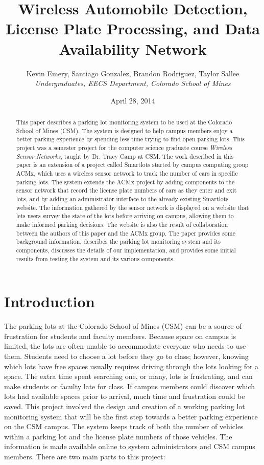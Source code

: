 \documentclass[11pt, oneside, fullpage, doublespace]{article}
\title{Wireless Automobile Detection, License Plate Processing, and Data Availability Network}
\author{Kevin Emery, Santiago Gonzalez, Brandon Rodriguez, Taylor Sallee\\ \emph{Undergraduates, EECS Department, Colorado School of Mines}}
\date{April 28, 2014}
\begin{document}
\maketitle

\begin{abstract}
This paper describes a parking lot monitoring system to be used at the Colorado School of Mines (CSM). The system is designed to help campus members enjoy a better parking experience by spending less time trying to find open parking lots. This project was a semester project for the computer science graduate course \emph{Wireless Sensor Networks}, taught by Dr. Tracy Camp at CSM. The work described in this paper is an extension of a project called Smartlots started by campus computing group ACMx, which uses a wireless sensor network to track the number of cars in specific parking lots. The system extends the ACMx project by adding components to the sensor network that record the license plate numbers of cars as they enter and exit lots, and by adding an administrator interface to the already existing Smartlots website. The information gathered by the sensor network is displayed on a website that lets users survey the state of the lots before arriving on campus, allowing them to make informed parking decisions. The website is also the result of collaboration between the authors of this paper and the ACMx group. The paper provides some background information, describes the parking lot monitoring system and its components, discusses the details of our implementation, and provides some initial results from testing the system and its various components.
\end{abstract}

\section{Introduction}
The parking lots at the Colorado School of Mines (CSM) can be a source of frustration for students and faculty members. Because space on campus is limited, the lots are often unable to accommodate everyone who needs to use them. Students need to choose a lot before they go to class; however, knowing which lots have free spaces usually requires driving through the lots looking for a space. The extra time spent searching one, or many, lots is frustrating, and can make students or faculty late for class. If campus members could discover which lots had available spaces prior to arrival, much time and frustration could be saved. This project involved the design and creation of a working parking lot monitoring system that will be the first step towards a better parking experience on the CSM campus. The system keeps track of both the number of vehicles within a parking lot and the license plate numbers of those vehicles. The information is made available online to system administrators and CSM campus members. There are two main parts to this project:
\end{document}
